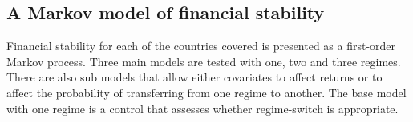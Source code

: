 \documentclass[12pt, a4paper, oneside]{article}\usepackage[]{graphicx}\usepackage[]{color}
\begin{document}


\subsection{A Markov model of financial stability}
Financial stability for each of the countries covered is presented as a first-order Markov process.  Three main models are tested with one, two and three regimes.  There are also sub models that allow either covariates to affect returns or to affect the probability of transferring from one regime to another. The base model with one regime is a control that assesses whether regime-switch is appropriate. 
\end{document}
